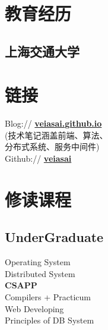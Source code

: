 \documentclass[]{deedy-resume-openfont}
\begin{document}
%
%
\lastupdated

%
%

%
%

\begin{minipage}[t]{0.3\textwidth} 


\section{教育经历} 
\sectionsep

\subsection{上海交通大学}
\sectionsep


\section{链接}
\sectionsep
Blog://  \href{http://veiasai.github.io}{\bf veiasai.github.io} \\
(技术笔记涵盖前端、算法、   \\
分布式系统、服务中间件)     \\    
Github:// \href{https://github.com/veiasai}{\bf veiasai} \\
\sectionsep


\section{修读课程}
\sectionsep
\subsection{UnderGraduate}
Operating System \\
Distributed System \\
\textbf{CSAPP} \\
Compilers + Practicum \\
Web Developing \\
Principles of DB System  \\
\sectionsep


\end{minipage}
\end{document}
